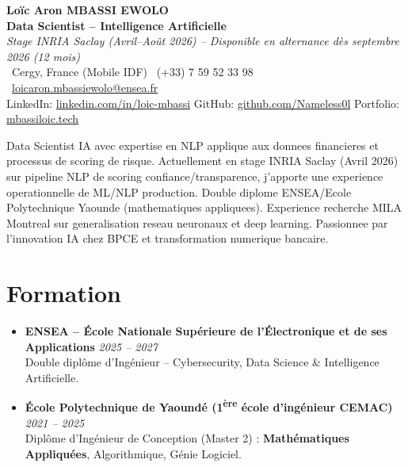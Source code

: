 \documentclass[a4paper,11pt]{article}
\begin{document}
\begin{center}
    {\Large \textbf{Lo\"ic Aron MBASSI EWOLO}} \\ \vspace{4pt}
    \textbf{\large Data Scientist -- Intelligence Artificielle} \\
    \textit{\small Stage INRIA Saclay (Avril--Ao\^ut 2026) -- Disponible en alternance d\`es septembre 2026 (12 mois)} \\ \vspace{4pt}
    \small
    \Pointinghand\ Cergy, France (Mobile IDF) \quad
    \Mobilefone\ (+33) 7 59 52 33 98 \quad
    {\color{primary}\Letter\ \href{mailto:loicaron.mbassiewolo@ensea.fr}{loicaron.mbassiewolo@ensea.fr}} \\ \vspace{2pt}
    {\color{primary}LinkedIn: \href{https://www.linkedin.com/in/loic-mbassi/}{linkedin.com/in/loic-mbassi}} \quad
    {\color{primary}GitHub: \href{https://github.com/Nameless0l}{github.com/Nameless0l}} \quad
    {\color{primary}Portfolio: \href{https://mbassiloic.tech}{mbassiloic.tech}}
\end{center}
\vspace{-6pt}
\noindent\small{Data Scientist IA avec expertise en NLP applique aux donnees financieres et processus de scoring de risque. Actuellement en stage INRIA Saclay (Avril 2026) sur pipeline NLP de scoring confiance/transparence, j'apporte une experience operationnelle de ML/NLP production. Double diplome ENSEA/Ecole Polytechnique Yaounde (mathematiques appliquees). Experience recherche MILA Montreal sur generalisation reseau neuronaux et deep learning. Passionnee par l'innovation IA chez BPCE et transformation numerique bancaire.}

\section{Formation}
\begin{itemize}[leftmargin=*, label=\tiny$\bullet$, nosep]
    \item \textbf{ENSEA -- \'Ecole Nationale Sup\'erieure de l'\'Electronique et de ses Applications} \hfill \textit{2025 -- 2027} \\
    \small{Double dipl\^ome d'Ing\'enieur -- Cybersecurity, Data Science \& Intelligence Artificielle.}
    \item \textbf{\'Ecole Polytechnique de Yaound\'e (1\textsuperscript{\`ere} \'ecole d'ing\'enieur CEMAC)} \hfill \textit{2021 -- 2025} \\
    \small{Dipl\^ome d'Ing\'enieur de Conception (Master 2) : \textbf{Math\'ematiques Appliqu\'ees}, Algorithmique, G\'enie Logiciel.}
\end{itemize}
\end{document}
